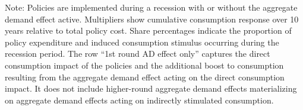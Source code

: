\documentclass[\latexroot/\projectname]{subfiles}
\begin{document}
\begin{table}[tb] 
  \caption{\pregenmark Comparing fiscal stimulus policy effectiveness}
  \whenintegrated{\label{tab:Multiplier}} %
  \centering


  \noindent\parbox{\textwidth}{
    \medskip
    \footnotesize Note: Policies are implemented during a recession with or without the aggregate demand effect active. Multipliers show cumulative consumption response over 10 years relative to total policy cost. Share percentages indicate the proportion of policy expenditure and induced consumption stimulus occurring during the recession period. The row ``1st round AD effect only'' captures the direct consumption impact of the policies and the additional boost to consumption resulting from the aggregate demand effect acting on the direct consumption impact. It does not include higher-round aggregate demand effects materializing on aggregate demand effects acting on indirectly stimulated consumption.
  }
\end{table}

\vspace{0.5em}
\end{document}
